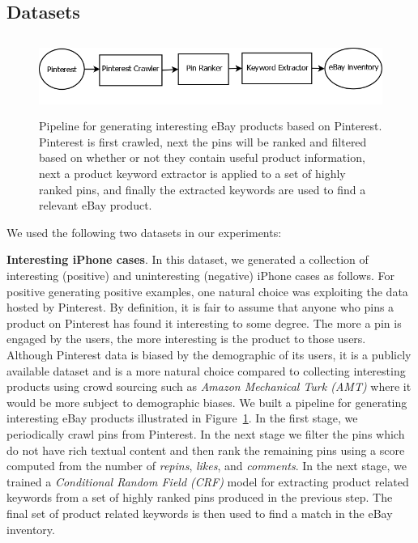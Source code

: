 \subsection{Datasets}
\label{sec:datasets}


\begin{figure}
\begin{center}
\includegraphics[height=2.5cm]{figures/Pipeline.png}
\caption{Pipeline for generating interesting eBay products based on Pinterest. Pinterest is first crawled, next the pins will be ranked and filtered based on whether or not they contain useful product information, next a product keyword extractor is applied to a set of highly ranked pins, and finally the extracted keywords are used to find a relevant eBay product.}
\end{center}
\label{fig:pinterest-pipeline}
\end{figure}

We used the following two datasets in our experiments: 

{\bf Interesting iPhone cases}.
In this dataset, we generated a collection of interesting (positive) and uninteresting (negative) iPhone cases as follows. For positive generating positive examples, one natural choice was exploiting the data hosted by Pinterest. By definition, it is fair to assume that anyone who pins a product on Pinterest has found it interesting to some degree. The more a pin is engaged by the users, the more interesting is the product to those users. Although Pinterest data is biased by the demographic of its users, it is a publicly available dataset and is a more natural choice compared to collecting interesting products using crowd sourcing such as  {\em Amazon Mechanical Turk (AMT)} where it would be more subject to demographic biases. We built a pipeline for generating interesting eBay products illustrated in Figure~\ref{fig:pinterest-pipeline}.  In the first stage, we periodically crawl pins from Pinterest. In the next stage we filter the pins which do not have rich textual content and then rank the remaining pins using a score computed from the number of {\em repins}, {\em likes}, and {\em comments}. In the next stage, we trained a {\em Conditional Random Field (CRF)} model for extracting product related keywords from a set of highly ranked pins produced in the previous step. The final set of product related keywords  is then used to find a match in the eBay inventory. 

